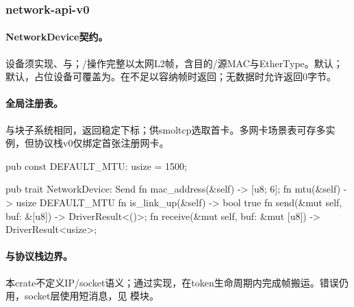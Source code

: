 
\subsubsection{network-api-v0}

\paragraph{NetworkDevice契约。}设备须实现、与；/操作完整以太网L2帧，含目的/源MAC与EtherType。默认；默认，占位设备可覆盖为。在不足以容纳帧时返回；无数据时允许返回0字节。

\paragraph{全局注册表。}与块子系统相同，返回稳定下标；供smoltcp选取首卡。多网卡场景表可存多实例，但协议栈v0仅绑定首张注册网卡。

\begin{rustcode}
pub const DEFAULT_MTU: usize = 1500;

pub trait NetworkDevice: Send {
    fn mac_address(&self) -> [u8; 6];
    fn mtu(&self) -> usize { DEFAULT_MTU }
    fn is_link_up(&self) -> bool { true }
    fn send(&mut self, buf: &[u8]) -> DriverResult<()>;
    fn receive(&mut self, buf: &mut [u8]) -> DriverResult<usize>;
}
\end{rustcode}

\paragraph{与协议栈边界。}本crate不定义IP/socket语义；通过实现，在token生命周期内完成帧搬运。错误仍用，socket层使用短消息，见  模块。
